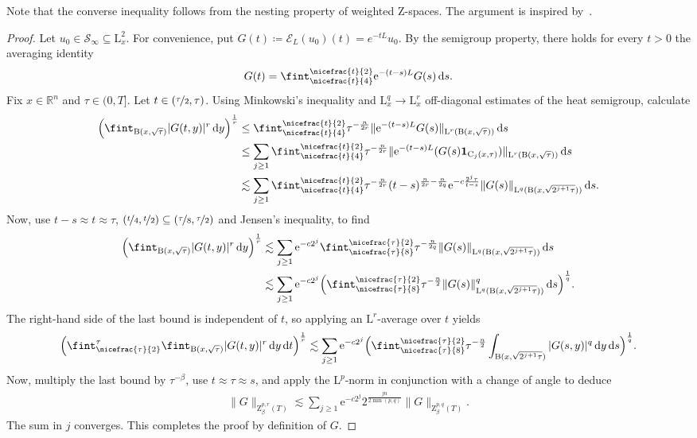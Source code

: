 \documentclass[11pt, leqno]{amsart}
\theoremstyle{definition}
\newcommand{\R}{\mathbb{R}}
\renewcommand{\L}{\mathrm{L}}
\newcommand{\Z}{\mathrm{Z}}
\newcommand{\Soo}{\mathcal{S}_\infty}
\newcommand{\Ext}{\mathcal{E}}
\newcommand{\ann}{\mathrm{C}}
\newcommand{\e}{\mathrm{e}}
\renewcommand{\d}{\,\mathrm{d}}
\newcommand{\B}{\mathrm{B}}
\newcommand{\ind}{\mathbf{1}}
\begin{document}
	Note that the converse inequality follows from the nesting property of weighted $\Z$-spaces. The argument is inspired by~\cite[Lem.~5.13]{Auscher_Frey}.

	\begin{proof}
		Let $u_0 \in \Soo \subseteq \L^2_x$.
		For convenience, put $G(t) \coloneqq \Ext_L(u_0)(t)= e^{-tL}u_{0}$. By the semigroup property, there holds for every $t>0$ the averaging identity
		\begin{align}
			G(t) = \fint_{\nicefrac{t}{4}}^{\nicefrac{t}{2}} \e^{-(t-s)L} G(s) \d s.
		\end{align}
		Fix $x \in \R^n$ and $\tau \in (0,T]$. Let $t\in (\nicefrac{\tau}{2}, \tau)$. Using Minkowski's inequality and $\L^q_x \to \L^r_x$ off-diagonal estimates of the heat semigroup, calculate
		\begin{align}
			\Bigl(\fint_{\B(x,\sqrt{\tau})} |G(t,y)|^r \d y \Bigr)^\frac{1}{r} &\leq \fint_{\nicefrac{t}{4}}^{\nicefrac{t}{2}} \tau^{-\frac{n}{2r}} \| \e^{-(t-s)L} G(s) \|_{\L^r(\B(x,\sqrt{\tau}))} \d s \\
			&\leq \sum_{j \geq 1} \fint_{\nicefrac{t}{4}}^{\nicefrac{t}{2}} \tau^{-\frac{n}{2r}} \| \e^{-(t-s)L} (G(s) \ind_{\ann_j(x,\tau)}) \|_{\L^r(\B(x,\sqrt{\tau}))} \d s \\
			&\lesssim \sum_{j \geq 1} \fint_{\nicefrac{t}{4}}^{\nicefrac{t}{2}} \tau^{-\frac{n}{2r}} (t-s)^{\frac{n}{2r} - \frac{n}{2q}} \e^{-c\frac{2^j \tau}{t-s}} \| G(s) \|_{\L^q(\B(x,\sqrt{2^{j+1}\tau}))} \d s.
		\end{align}
		Now, use $t-s\approx t \approx \tau$, $(\nicefrac{t}{4}, \nicefrac{t}{2}) \subseteq (\nicefrac{\tau}{8}, \nicefrac{\tau}{2})$ and Jensen's inequality, to find
		\begin{align}
			\Bigl(\fint_{\B(x,\sqrt{\tau})} |G(t,y)|^r \d y \Bigr)^\frac{1}{r} &\lesssim \sum_{j \geq 1} \e^{-c2^j} \fint_{\nicefrac{\tau}{8}}^{\nicefrac{\tau}{2}} \tau^{- \frac{n}{2q}} \| G(s) \|_{\L^q(\B(x,\sqrt{2^{j+1}\tau}))} \d s \\
			&\lesssim \sum_{j \geq 1} \e^{-c2^j} \Bigl( \fint_{\nicefrac{\tau}{8}}^{\nicefrac{\tau}{2}} \tau^{- \frac{n}{2}} \| G(s) \|_{\L^q(\B(x,\sqrt{2^{j+1}\tau}))}^q \d s \Bigr)^\frac{1}{q}.
		\end{align}
		The right-hand side of the last bound is independent of $t$, so applying an $\L^r$-average over $t$ yields
		\begin{align}
				\Bigl(\fint_{\nicefrac{\tau}{2}}^\tau \fint_{\B(x,\sqrt{\tau})} |G(t,y)|^r \d y \d t \Bigr)^\frac{1}{r} \lesssim \sum_{j \geq 1} \e^{-c2^j} \Bigl( \fint_{\nicefrac{\tau}{8}}^{\nicefrac{\tau}{2}} \tau^{- \frac{n}{2}} \int_{\B(x,\sqrt{2^{j+1}\tau})} |G(s,y)|^q \d y \d s \Bigr)^\frac{1}{q}.
		\end{align}
		Now, multiply the last bound by $\tau^{-\beta}$, use $t \approx \tau \approx s$, and apply the $\L^p$-norm in conjunction with a change of angle to deduce
		\begin{align}
			\| G \|_{\Z^{p,r}_\beta(T)} \lesssim \sum_{j \geq 1} \e^{-c2^j} 2^\frac{jn}{2\min(p,q)} \| G \|_{\Z^{p,q}_\beta(T)}.
		\end{align}
		The sum in $j$ converges. This completes the proof by definition of $G$.
	\end{proof}
\end{document}
